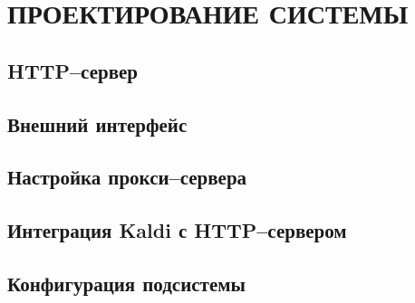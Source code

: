 \chapter{ПРОЕКТИРОВАНИЕ СИСТЕМЫ}

\section{HTTP--сервер}
\section{Внешний интерфейс}
\section{Настройка прокси--сервера}
\section{Интеграция Kaldi с HTTP--сервером}
\section{Конфигурация подсистемы}

